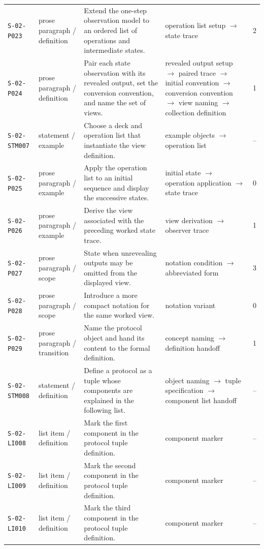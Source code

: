 \documentclass[10pt]{article}
\begin{document}
\begin{longtable}{@{}p{}p{}p{}p{}p{}@{}}
\texttt{S-02-P023}&prose paragraph / definition&Extend the one-step observation model to an ordered list of operations and intermediate states.&operation list setup $\rightarrow$ state trace&2\\
\texttt{S-02-P024}&prose paragraph / definition&Pair each state observation with its revealed output, set the conversion convention, and name the set of views.&revealed output setup $\rightarrow$ paired trace $\rightarrow$ initial convention $\rightarrow$ conversion convention $\rightarrow$ view naming $\rightarrow$ collection definition&1\\
\texttt{S-02-STM007}&statement / example&Choose a deck and operation list that instantiate the view definition.&example objects $\rightarrow$ operation list&--\\
\texttt{S-02-P025}&prose paragraph / example&Apply the operation list to an initial sequence and display the successive states.&initial state $\rightarrow$ operation application $\rightarrow$ state trace&0\\
\texttt{S-02-P026}&prose paragraph / example&Derive the view associated with the preceding worked state trace.&view derivation $\rightarrow$ observer trace&1\\
\texttt{S-02-P027}&prose paragraph / scope&State when unrevealing outputs may be omitted from the displayed view.&notation condition $\rightarrow$ abbreviated form&3\\
\texttt{S-02-P028}&prose paragraph / scope&Introduce a more compact notation for the same worked view.&notation variant&0\\
\texttt{S-02-P029}&prose paragraph / transition&Name the protocol object and hand its content to the formal definition.&concept naming $\rightarrow$ definition handoff&1\\
\texttt{S-02-STM008}&statement / definition&Define a protocol as a tuple whose components are explained in the following list.&object naming $\rightarrow$ tuple specification $\rightarrow$ component list handoff&--\\
\texttt{S-02-LI008}&list item / definition&Mark the first component in the protocol tuple definition.&component marker&--\\
\texttt{S-02-LI009}&list item / definition&Mark the second component in the protocol tuple definition.&component marker&--\\
\texttt{S-02-LI010}&list item / definition&Mark the third component in the protocol tuple definition.&component marker&--\\

\end{longtable}
\end{document}
